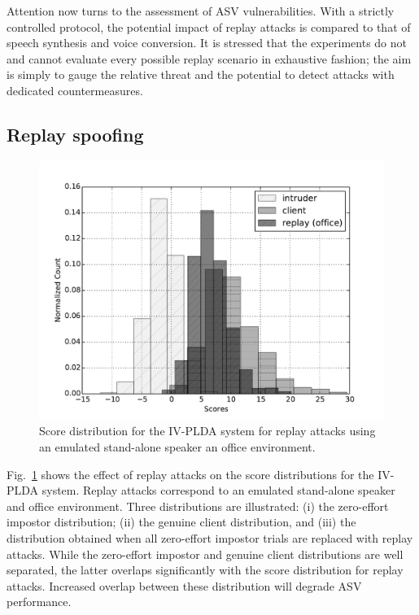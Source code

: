 
Attention now turns to the assessment of ASV vulnerabilities.  With a strictly controlled protocol, the potential impact of replay attacks is compared to that of speech synthesis and voice conversion.  It is stressed that the experiments do not and cannot evaluate every possible replay scenario in exhaustive fashion; the aim is simply to gauge the relative threat and the potential to detect attacks with dedicated countermeasures.


\subsection{Replay spoofing}

\begin{figure}[!t]
	\centering
	\includegraphics[width=1\linewidth]{Figs/dist_IV_off.pdf}
	\caption{Score distribution for the IV-PLDA system for replay attacks using an emulated stand-alone speaker an office environment.}
	\label{fig::Dist_IV}
\end{figure}


Fig.~\ref{fig::Dist_IV} shows the effect of replay attacks on the score distributions for the IV-PLDA system.  Replay attacks correspond to an emulated stand-alone speaker and office environment.  Three distributions are illustrated: (i) the zero-effort impostor distribution; (ii) the genuine client distribution, and (iii) the distribution obtained when all zero-effort impostor trials are replaced with replay attacks.  While the zero-effort impostor and genuine client distributions are well separated, the latter overlaps significantly with the score distribution for replay attacks.  Increased overlap between these distribution will degrade ASV performance.



